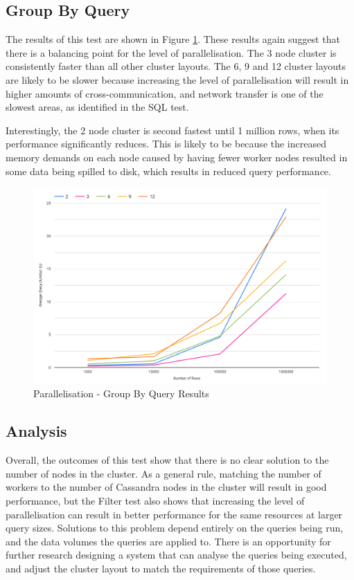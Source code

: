 \subsection{Group By Query}
The results of this test are shown in Figure \ref{fig:group-by-simple-parallelisation-test}. These results again suggest that there is a balancing point for the level of parallelisation. The 3 node cluster is consistently faster than all other cluster layouts. The 6, 9 and 12 cluster layouts are likely to be slower because increasing the level of parallelisation will result in higher amounts of cross-communication, and network transfer is one of the slowest areas, as identified in the SQL test.

Interestingly, the 2 node cluster is second fastest until 1 million rows, when its performance significantly reduces. This is likely to be because the increased memory demands on each node caused by having fewer worker nodes resulted in some data being spilled to disk, which results in reduced query performance.

\begin{figure}[ht]
	\centering
	\includegraphics[width=0.8\linewidth]{chapters/diagrams/testing/group-by-simple-parallelisation-test}
	\caption{Parallelisation - Group By Query Results}
	\label{fig:group-by-simple-parallelisation-test}
\end{figure}

\subsection{Analysis}
Overall, the outcomes of this test show that there is no clear solution to the number of nodes in the cluster. As a general rule, matching the number of workers to the number of Cassandra nodes in the cluster will result in good performance, but the Filter test also shows that increasing the level of parallelisation can result in better performance for the same resources at larger query sizes. Solutions to this problem depend entirely on the queries being run, and the data volumes the queries are applied to. There is an opportunity for further research designing a system that can analyse the queries being executed, and adjust the cluster layout to match the requirements of those queries.

